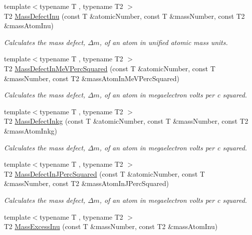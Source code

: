\begin{DoxyCompactItemize}
{\footnotesize template$<$typename T , typename T2 $>$ }\\T2 \mbox{\hyperlink{group___e_g_x_phys-_mass_defect_ga70400004a5cb622de372ab84670731ef}{Mass\+Defect\+Inu}} (const T \&atomic\+Number, const T \&mass\+Number, const T2 \&mass\+Atom\+Inu)
\begin{DoxyCompactList}\small\item\em Calculates the mass defect, $\Delta m$, of an atom in unified atomic mass units. \end{DoxyCompactList}\item 
{\footnotesize template$<$typename T , typename T2 $>$ }\\T2 \mbox{\hyperlink{group___e_g_x_phys-_mass_defect_gab51169bf871d0ea0ee0642fa300228fe}{Mass\+Defect\+In\+Me\+V\+Perc\+Squared}} (const T \&atomic\+Number, const T \&mass\+Number, const T2 \&mass\+Atom\+In\+Me\+V\+Perc\+Squared)
\begin{DoxyCompactList}\small\item\em Calculates the mass defect, $\Delta m$, of an atom in megaelectron volts per c squared. \end{DoxyCompactList}\item 
{\footnotesize template$<$typename T , typename T2 $>$ }\\T2 \mbox{\hyperlink{group___e_g_x_phys-_mass_defect_gad5378933021e13598a76bd8581b1e887}{Mass\+Defect\+Inkg}} (const T \&atomic\+Number, const T \&mass\+Number, const T2 \&mass\+Atom\+Inkg)
\begin{DoxyCompactList}\small\item\em Calculates the mass defect, $\Delta m$, of an atom in megaelectron volts per c squared. \end{DoxyCompactList}\item 
{\footnotesize template$<$typename T , typename T2 $>$ }\\T2 \mbox{\hyperlink{group___e_g_x_phys-_mass_defect_ga08cff1dfa3259af8f1b67ec741796e91}{Mass\+Defect\+In\+J\+Perc\+Squared}} (const T \&atomic\+Number, const T \&mass\+Number, const T2 \&mass\+Atom\+In\+J\+Perc\+Squared)
\begin{DoxyCompactList}\small\item\em Calculates the mass defect, $\Delta m$, of an atom in megaelectron volts per c squared. \end{DoxyCompactList}\item 
{\footnotesize template$<$typename T , typename T2 $>$ }\\T2 \mbox{\hyperlink{group___e_g_x_phys-_mass_excess_ga61c6f557bd742126c0c76e88cf7740ad}{Mass\+Excess\+Inu}} (const T \&mass\+Number, const T2 \&mass\+Atom\+Inu)

\end{DoxyCompactItemize}
